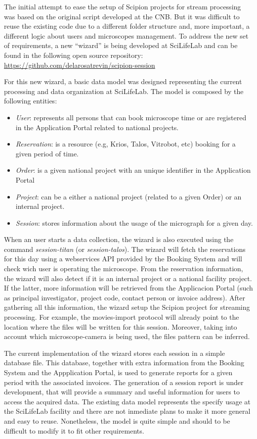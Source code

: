 The initial attempt to ease the setup of Scipion projects for stream processing was based  
on the original script developed at the CNB. But it was difficult to reuse the existing code due to a different folder
structure and, more important, a different logic about users and microscopes management. To address the new set
of requirements, a new ``wizard'' is being developed at SciLifeLab and can be found in the following open source repository: 
\url{https://github.com/delarosatrevin/scipion-session}

For this new wizard, a basic data model was designed representing the current processing and data 
organization at SciLifeLab. The model is composed by the following entities:

\begin{itemize}
\setlength\itemsep{0em}
 \item \textit{User}: represents all persons that can book microscope time or are registered in the Application Portal 
 related to national projects.
 \item \textit{Reservation}:  is a resource (e.g, Krios, Talos, Vitrobot, etc) booking for a given period of time.
 \item \textit{Order}:  is a given national project with an unique identifier in the Application Portal
 \item \textit{Project}:  can be a either a national project (related to a given Order) or an internal project.
 \item \textit{Session}:  stores information about the usage of the micrograph for a given day.
\end{itemize}

When an user starts a data collection, the wizard is also executed using the command \textit{session-titan} 
(or \textit{session-talos}). The wizard will fetch the reservations for this day using a webservices API provided by 
the Booking System and will check wich user is operating the microscope. From the reservation information, 
the wizard will also detect if it is an internal project or a national facility project. If the latter,
more information will be retrieved from the Applicacion Portal (such as principal investigator, project code, 
contact person or invoice address). After gathering all this information, the wizard setup the Scipion project
for streaming processing. For example, the movies-import protocol will already point to the location where
the files will be written for this session. Moreover, taking into account which microscope-camera is being 
used, the files pattern can be inferred. 

The current implementation of the wizard stores each session in a simple database file. This database, together
with extra information from the Booking System and the Appplication Portal, is used to generate reports for 
a given period with the associated invoices. The generation of a session report is under development, that 
will provide a summary and useful information for users to access the acquired data. The existing data model 
represents the specify usage at the SciLifeLab facility and there are not inmediate plans to make it more 
general and easy to reuse. Nonetheless, the model is quite simple and should to be difficult to modify it to fit 
other requirements. 


